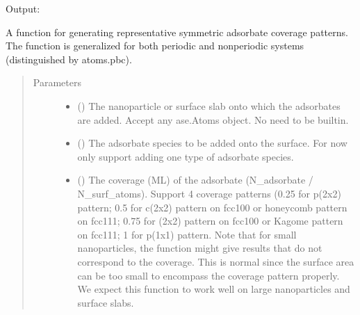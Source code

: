 \documentclass[letterpaper,10pt,english]{sphinxmanual}
\begin{document}
Output:

\noindent{}

\begin{fulllineitems}
\label{\detokenize{build:acat.build.patterns.symmetric_coverage_pattern}}
A function for generating representative symmetric adsorbate
coverage patterns. The function is generalized for both periodic
and non\sphinxhyphen{}periodic systems (distinguished by atoms.pbc).
\begin{quote}\begin{description}
\item[{Parameters}] \leavevmode\begin{itemize}
\item {} 
 () \textendash{} The nanoparticle or surface slab onto which the adsorbates are
added. Accept any ase.Atoms object. No need to be built\sphinxhyphen{}in.

\item {} 
 () \textendash{} The adsorbate species to be added onto the surface.
For now only support adding one type of adsorbate species.

\item {} 
 (\sphinxstyleliteralemphasis{\sphinxupquote{, }}) \textendash{} The coverage (ML) of the adsorbate (N\_adsorbate / N\_surf\_atoms).
Support 4 coverage patterns (0.25 for p(2x2) pattern;
0.5 for c(2x2) pattern on fcc100 or honeycomb pattern on fcc111;
0.75 for (2x2) pattern on fcc100 or Kagome pattern on fcc111;
1 for p(1x1) pattern.
Note that for small nanoparticles, the function might give
results that do not correspond to the coverage. This is normal
since the surface area can be too small to encompass the
coverage pattern properly. We expect this function to work
well on large nanoparticles and surface slabs.


\end{itemize}
\end{description}
\end{quote}
\end{fulllineitems}
\end{document}
